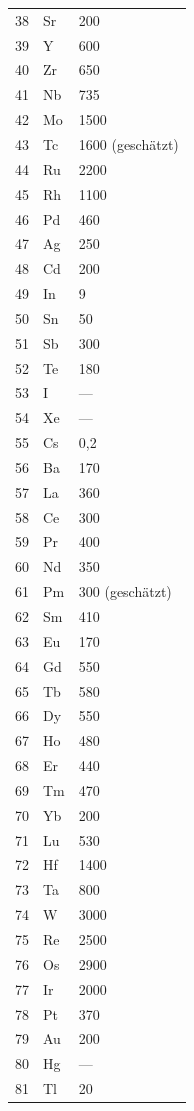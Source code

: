 \documentclass[12pt,a4paper]{article}
\begin{document}
\begin{longtable}{p{0.6cm}p{1.2cm}p{2.5cm}}
		38 & Sr & 200 \\
		39 & Y  & 600 \\
		40 & Zr & 650 \\
		41 & Nb & 735 \\
		42 & Mo & 1500 \\
		43 & Tc & 1600 (geschätzt) \\
		44 & Ru & 2200 \\
		45 & Rh & 1100 \\
		46 & Pd & 460 \\
		47 & Ag & 250 \\
		48 & Cd & 200 \\
		49 & In & 9 \\
		50 & Sn & 50 \\
		51 & Sb & 300 \\
		52 & Te & 180 \\
		53 & I  & — \\
		54 & Xe & — \\
		55 & Cs & 0,2 \\
		56 & Ba & 170 \\
		57 & La & 360 \\
		58 & Ce & 300 \\
		59 & Pr & 400 \\
		60 & Nd & 350 \\
		61 & Pm & 300 (geschätzt) \\
		62 & Sm & 410 \\
		63 & Eu & 170 \\
		64 & Gd & 550 \\
		65 & Tb & 580 \\
		66 & Dy & 550 \\
		67 & Ho & 480 \\
		68 & Er & 440 \\
		69 & Tm & 470 \\
		70 & Yb & 200 \\
		71 & Lu & 530 \\
		72 & Hf & 1400 \\
		73 & Ta & 800 \\
		74 & W  & 3000 \\
		75 & Re & 2500 \\
		76 & Os & 2900 \\
		77 & Ir & 2000 \\
		78 & Pt & 370 \\
		79 & Au & 200 \\
		80 & Hg & — \\
		81 & Tl & 20 \\

\end{longtable}
\end{document}
